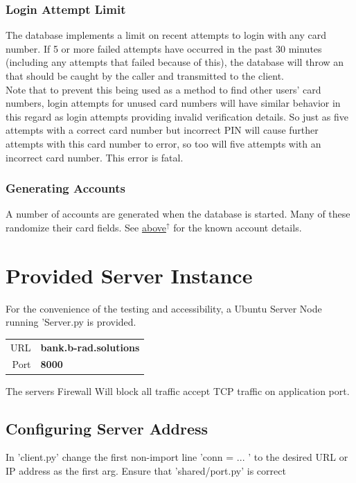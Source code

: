 \documentclass{article}
\newcommand{\code}[1]{\tcbox[
    on line,
    colback=codebackground, boxsep=2pt,
    colframe=white, boxrule=0pt,
    top=0pt, bottom=0pt, left=0pt, right=0pt
]{\texttt{#1}}}
\begin{document}
\subsubsection{Login Attempt Limit}
\label{sec:CardLoginAttemptLimit}
The database implements a limit on recent attempts to login with any card number.
If 5 or more failed attempts have occurred in the past 30 minutes (including any attempts that failed because of this),
the database will throw an \code{AttemptsExceededError} that should be caught by the caller and transmitted to the client. \\
Note that to prevent this being used as a method to find other users' card numbers, login attempts for
unused card numbers will have similar behavior in this regard as login attempts providing invalid verification details.
So just as five attempts with a correct card number but incorrect PIN will cause further attempts with this card number to error,
so too will five attempts with an incorrect card number. This error is fatal.

\subsubsection{Generating Accounts}
A number of accounts are generated when the database is started.
Many of these randomize their card fields.
See \hyperref[sec:ProvidedAccounts]{above$^\uparrow$} for the known account details.

\newpage
\section{Provided Server Instance}
For the convenience of the testing and accessibility, a Ubuntu Server Node running 'Server.py is provided.
\begin{center}
    \begin{tabular}{r|l}
        URL     & \textbf{bank.b-rad.solutions} \\
        Port             & \textbf{8000}              \\

    \end{tabular}
\end{center}
The servers Firewall Will block all traffic accept TCP traffic on application port.

\subsection{Configuring Server Address}
In 'client.py' change the first non-import line 'conn = ... ' to the desired URL or IP address as the first arg. Ensure that 'shared/port.py' is correct
\end{document}
